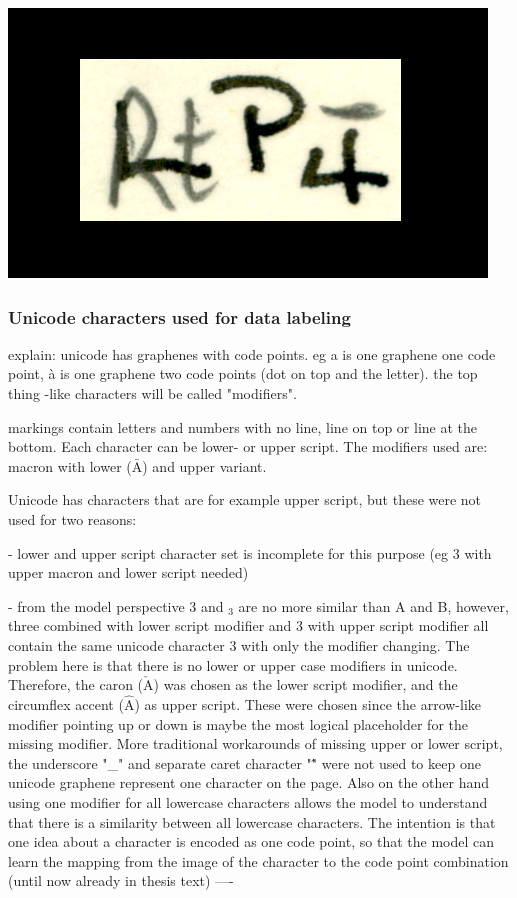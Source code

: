 \documentclass{article}
\begin{document}
\includegraphics*[scale=0.2]{../images/superambiguous_data_sample.png}

\subsubsection{Unicode characters used for data labeling}

explain: unicode has graphenes with code points. eg a is one graphene one code point,
à is one graphene two code points (dot on top and the letter). the top thing -like characters will be called 
"modifiers".

markings contain letters and numbers with no line, line on top or line at the bottom.
Each character can be lower- or upper script. The modifiers used are: 
macron with lower ($\bar{\mathrm{A}}$) and upper variant.

Unicode \cite{unicode_homepage} has characters that are for example upper script, but 
these were not used for two reasons:

- lower and upper script character set is incomplete for this purpose (eg 3 with upper macron and lower script needed)

- from the model perspective 3 and $_3$ are no more similar than A and B, however, 
three combined with lower script modifier and 3 with upper script modifier 
all contain the same unicode character 3 with only the modifier changing. The 
problem here is that there is no lower or upper case modifiers in unicode. Therefore,
the caron ($\check{\mathrm{A}}$) was chosen as the lower script modifier, and the circumflex accent ($\hat{\mathrm{A}}$)
as upper script. These were chosen since the arrow-like modifier pointing up or down
is maybe the most logical placeholder for the missing modifier. More traditional 
workarounds of missing upper or lower script, the underscore "\_" and separate 
caret character "\^ " were not used to keep one unicode graphene represent one character 
on the page. Also on the other hand using one modifier for all lowercase characters allows 
the model to understand that there is a similarity between all lowercase characters.
The intention is that one idea about a character is encoded as one code point, so that 
the model can learn the mapping from the image of the character to the code point 
combination
(until now already in thesis text)
----
\end{document}
